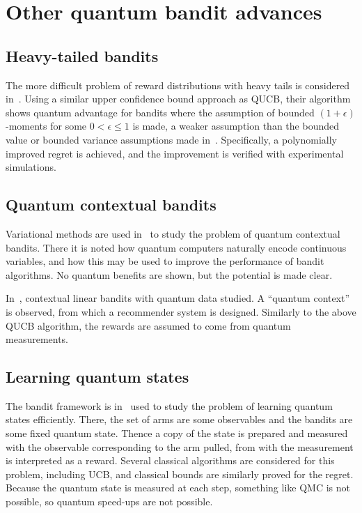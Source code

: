 \section{Other quantum bandit advances}

\subsection{Heavy-tailed bandits}
The more difficult problem of reward distributions with heavy tails is considered in~\autocite{wu2023}.
Using a similar upper confidence bound approach as QUCB, their algorithm shows quantum advantage for bandits where the assumption of bounded $(1 + \epsilon)$-moments for some $0<\epsilon \leq 1$ is made, a weaker assumption than the bounded value or bounded variance assumptions made in~\autocite{wan2022}.
Specifically, a polynomially improved regret is achieved, and the improvement is verified with experimental simulations.

\subsection{Quantum contextual bandits}
Variational methods are used in~\autocite{hu2019} to study the problem of quantum contextual bandits.
There it is noted how quantum computers naturally encode continuous variables, and how this may be used to improve the performance of bandit algorithms.
No quantum benefits are shown, but the potential is made clear.

In~\autocite{brahmachari2023}, contextual linear bandits with quantum data studied.
A \enquote{quantum context} is observed, from which a recommender system is designed.
Similarly to the above QUCB algorithm, the rewards are assumed to come from quantum measurements.


\subsection{Learning quantum states}
The bandit framework is in~\autocite{lumbreras2022} used to study the problem of learning quantum states efficiently.
There, the set of arms are some observables and the bandits are some fixed quantum state.
Thence a copy of the state is prepared and measured with the observable corresponding to the arm pulled, from with the measurement is interpreted as a reward.
Several classical algorithms are considered for this problem, including UCB, and classical bounds are similarly proved for the regret.
Because the quantum state is measured at each step, something like QMC is not possible, so quantum speed-ups are not possible.


